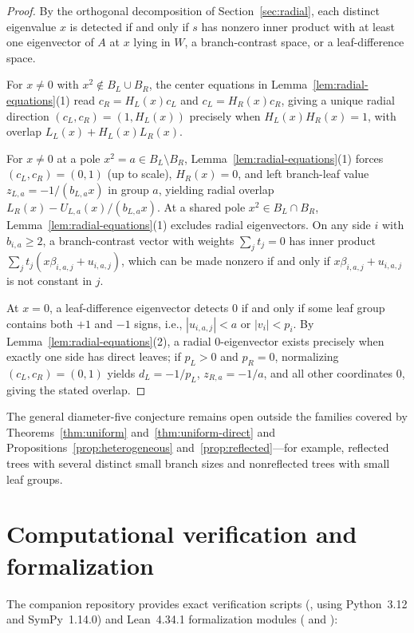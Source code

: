 \documentclass[11pt]{article}
\theoremstyle{plain}
\theoremstyle{remark}
\begin{document}
\begin{proof}
By the orthogonal decomposition of Section~\ref{sec:radial}, each distinct
eigenvalue $x$ is detected if and only if $s$ has nonzero inner product with at
least one eigenvector of $A$ at $x$ lying in $W$, a branch-contrast space, or a
leaf-difference space.

For $x \neq 0$ with $x^2 \notin B_L \cup B_R$, the center equations in
Lemma~\ref{lem:radial-equations}(1) read $c_R = H_L(x) c_L$ and
$c_L = H_R(x) c_R$, giving a unique radial direction $(c_L, c_R) = (1, H_L(x))$
precisely when $H_L(x) H_R(x) = 1$, with overlap $L_L(x) + H_L(x) L_R(x)$.

For $x \neq 0$ at a pole $x^2 = a \in B_L \setminus B_R$,
Lemma~\ref{lem:radial-equations}(1) forces $(c_L, c_R) = (0,1)$ (up to scale),
$H_R(x) = 0$, and left branch-leaf value $z_{L,a} = -1/(b_{L,a} x)$ in group
$a$, yielding radial overlap $L_R(x) - U_{L,a}(x)/(b_{L,a} x)$. At a shared
pole $x^2 \in B_L \cap B_R$, Lemma~\ref{lem:radial-equations}(1) excludes
radial eigenvectors. On any side $i$ with $b_{i,a} \geq 2$, a branch-contrast
vector with weights $\sum_j t_j = 0$ has inner product
$\sum_j t_j(x\beta_{i,a,j} + u_{i,a,j})$, which can be made nonzero if and only
if $x\beta_{i,a,j} + u_{i,a,j}$ is not constant in $j$.

At $x = 0$, a leaf-difference eigenvector detects $0$ if and only if some leaf
group contains both $+1$ and $-1$ signs, i.e., $|u_{i,a,j}| < a$ or
$|v_i| < p_i$. By Lemma~\ref{lem:radial-equations}(2), a radial $0$-eigenvector
exists precisely when exactly one side has direct leaves; if $p_L > 0$ and
$p_R = 0$, normalizing $(c_L, c_R) = (0,1)$ yields $d_L = -1/p_L$,
$z_{R,a} = -1/a$, and all other coordinates $0$, giving the stated overlap.
\end{proof}

The general diameter-five conjecture remains open outside the families covered
by Theorems~\ref{thm:uniform} and~\ref{thm:uniform-direct} and
Propositions~\ref{prop:heterogeneous} and~\ref{prop:reflected}---for example,
reflected trees with several distinct small branch sizes and nonreflected trees
with small leaf groups.

\section{Computational verification and formalization}\label{sec:repro}

The companion repository provides exact verification scripts
(, using Python~3.12 and SymPy~1.14.0) and Lean~4.34.1
formalization modules ( and
):
\end{document}
